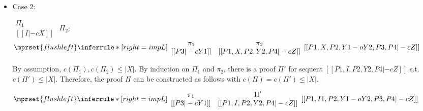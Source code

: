\begin{itemize}
\item Case 2:
      \begin{center}
        \scriptsize
        \begin{math}
          \begin{array}{c}
            \Pi_1 \\
            {[[I |-c X]]}
          \end{array}
        \end{math}
        \qquad\qquad
        $\Pi_2$:
        \begin{math}
          $$\mprset{flushleft}
          \inferrule* [right={\tiny impL}] {
            {
              \begin{array}{cc}
                \pi_1 & \pi_2 \\
                {[[P3 |-c Y1]]} & {[[P1, X, P2, Y2, P4 |-c Z]]}
              \end{array}
            }
          }{[[P1, X, P2, Y1 -o Y2, P3, P4 |-c Z]]}
        \end{math}
      \end{center}
      By assumption, $c(\Pi_1),c(\Pi_2)\leq |X|$. By induction on $\Pi_1$ and $\pi_2$, there is
      a proof $\Pi'$ for sequent $[[P1, I, P2, Y2, P4 |-c Z]]$ s.t. $c(\Pi') \leq |X|$.
      Therefore, the proof $\Pi$ can be constructed as follows with
      $c(\Pi) = c(\Pi') \leq |X|$.
      \begin{center}
        \scriptsize
        \begin{math}
          $$\mprset{flushleft}
          \inferrule* [right={\tiny impL}] {
            {
              \begin{array}{cc}
                \pi_1 & \Pi' \\
                {[[P3 |-c Y1]]} & {[[P1, I, P2, Y2, P4 |-c Z]]}
              \end{array}
            }
          }{[[P1, I1, P2, Y1 -o Y2, P3, P4 |-c Z]]}
        \end{math}
      \end{center}


\end{itemize}
